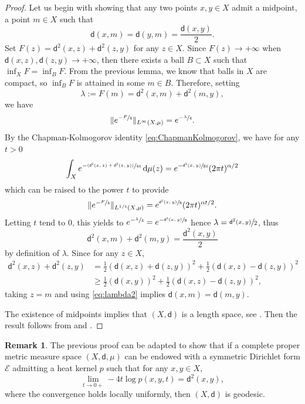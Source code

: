 \documentclass[JEP,XML,SOM,Unicode,published]{cedram}
\newcommand{\psfrac}[2]{\sfrac{(#1)}{#2}}
\theoremstyle{plain}
\theoremstyle{definition}
\newtheorem{remark}[theorem]{Remark}
\newcommand{\cE}{\mathcal{E}}
\newcommand{\di}{\mathop{}\!\mathrm{d}}
\newcommand{\dist}{\mathsf{d}}
\begin{document}
\begin{proof}
Let us begin with showing that any two points $x,y \in X$ admit a midpoint, \ie a point $m \in X$ such that
\begin{equation}\label{eq:middle}
\dist(x,m)=\dist(y,m)=\frac{\dist(x,y)}{2}.
\end{equation}
Set $F(z)=\dist^2(x,z)+\dist^2(z,y)$ for any $z \in X$. Since $F(z) \to +\infty$ when $\dist(x,z), \dist(z,y) \to +\infty$, then there exists a ball $B \subset X$ such that $\inf_X F = \inf_B F$. From the previous lemma, we know that balls in $X$ are compact, so $\inf_B F$ is attained in some $m \in B$. Therefore, setting
\[
\lambda:=F(m)=\dist^2(x,m)+\dist^2(m,y),
\]
we have
\[
\|e^{-\sfrac{F}{4}}\|_{L^\infty(X,\mu)} = e^{-\sfrac{\lambda}{4}}.
\]
By the Chapman-Kolmogorov identity \eqref{eq:ChapmanKolmogorov}, we have for any $t>0$
\[
\int_X e^{-\psfrac{\dist^2(x,z)+\dist^2(z,y)}{4t}}\di \mu(z) = e^{-\sfrac{\dist^2(x,y)}{8t}}(2\pi t)^{\alpha/2}
\]
which can be raised to the power $t$ to provide
\[
\|e^{-\sfrac{F}{4}}\|_{L^{1/t}(X,\mu)} = e^{\sfrac{\dist^2(x,y)}{8}}(2\pi t)^{\alpha t/2}.
\]
Letting $t$ tend to $0$, this yields to $e^{-\sfrac{\lambda}{4}}=e^{-\sfrac{\dist^2(x,y)}{8}}$ hence $\lambda=\sfrac{\dist^2(x,y)}{2}$, thus \begin{equation}\label{eq:lambda2} \dist^2(x,m)+\dist^2(m,y) = \frac{\dist^2(x,y)}{2}
\end{equation}
by definition of $\lambda$. Since for any $z \in X$,
\begin{align*}
\dist^2(x,z)+\dist^2(z,y) & = \frac{1}{2}(\dist(x,z)+\dist(z,y))^2 + \frac{1}{2}(\dist(x,z)-\dist(z,y))^2\\
&\ge \frac{1}{2}(\dist(x,y))^2 + \frac{1}{2}(\dist(x,z)-\dist(z,y))^2,
\end{align*}
taking $z=m$ and using \eqref{eq:lambda2} implies $\dist(x,m)=\dist(m,y)$.

The existence of midpoints implies that $(X,\dist)$ is a length space, see \cite[Th.\,2.4.16\,(1)]{BuragoBuragoIvanov}. Then the result follows from \cite[Th.\,2.5.23]{BuragoBuragoIvanov} and \cite[Th.\,2.5.9]{BuragoBuragoIvanov}.
\end{proof}
\begin{remark}\label{rem:geodesicplus}
The previous proof can be adapted to show that if a complete proper metric measure space $(X,\dist,\mu)$ can be endowed with a symmetric Dirichlet form $\cE$ admitting a heat kernel $p$ such that for any $x,y\in X$,
\[
\lim_{t\to 0+}-4t\log p(x,y,t)=\dist^2(x,y),
\]
where the convergence holds locally uniformly, then $(X,\dist)$ is geodesic.
\end{remark}
\end{document}

